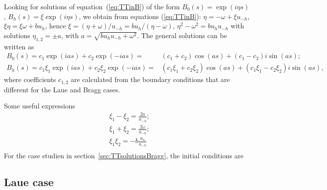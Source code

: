 \documentclass[preprint]{iucr}              %
\begin{document}
Looking for solutions of equation~(\ref{eq:TTinB}) of the form $B_0(s)=\exp(i \eta s)$, $B_h(s)=\xi \exp(i \eta s)$, we obtain from equations (\ref{eq:TTinB}): $\eta =-\omega + \xi u_{-h}$, $\xi \eta=\xi \omega+b u_h$,
hence $\xi=(\eta+\omega)/u_{-h}=b u_h / (\eta-\omega)$, $\eta^2-\omega^2=b u_h u_{-h}$ with solutions $\eta_{1,2}=\pm a$, with $a=\sqrt{b u_h u_{-h}+\omega^2}$.
The general solutions can be written as 
\begin{subequations}
\label{eq:BSolutions}
\begin{align}
B_0(s) = c_1 \exp(i a s) + c_2 \exp(-i a s) =& (c_1+c_2) \cos(as) + (c_1-c_2) i \sin(as); \\
B_h(s) = c_1 \xi_1 \exp(i a s) + c_2 \xi_2 \exp(-i a s) =& (c_1 \xi_1+c_2 \xi_2) \cos(as) + (c_1 \xi_1-c_2 \xi_2) i \sin(as),
\end{align}
\end{subequations}
where coefficients $c_{1,2}$ are calculated from the boundary conditions that are different for the Laue and Bragg cases.

Some useful expressions
\begin{subequations}
\label{eq:TTuseful}
\begin{align}
&\xi_1-\xi_2 = \frac{2 a}{u_{-h}};\\
&\xi_1+\xi_2 = \frac{2 \omega}{u_{-h}};\\
&\xi_1 \xi_2 = -b \frac{u_h}{u_{-h}}\\
\end{align}
\end{subequations}
For the case studien in section~\ref{sec:TTsolutionsBragg}, the initial conditions are 
%
\subsection{Laue case}
\label{sec:TTsolutionsLaue}
\end{document}
